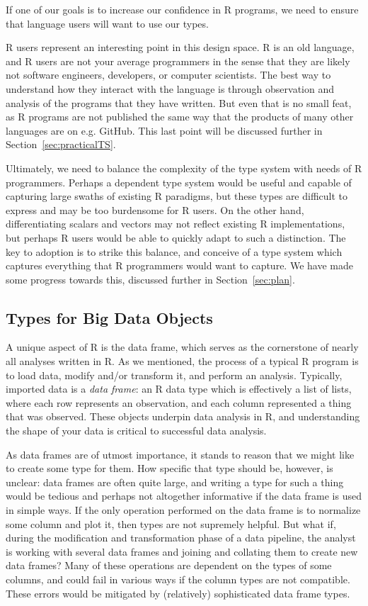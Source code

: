 \documentclass[sigplan,10pt,review,anonymous]{acmart}\settopmatter{printfolios=true,printccs=false,printacmref=false}
\begin{document}
If one of our goals is to increase our confidence in R programs, we need to ensure that language users will want to use our types.

R users represent an interesting point in this design space.
R is an old language, and R users are not your average programmers in the sense that they are likely not software engineers, developers, or computer scientists.
The best way to understand how they interact with the language is through observation and analysis of the programs that they have written.
But even that is no small feat, as R programs are not published the same way that the products of many other languages are on e.g. GitHub.
This last point will be discussed further in Section~\ref{sec:practicalTS}.

Ultimately, we need to balance the complexity of the type system with needs of R programmers.
Perhaps a dependent type system would be useful and capable of capturing large swaths of existing R paradigms, but these types are difficult to express and may be too burdensome for R users. 
On the other hand, differentiating scalars and vectors may not reflect existing R implementations, but perhaps R users would be able to quickly adapt to such a distinction.
The key to adoption is to strike this balance, and conceive of a type system which captures everything that R programmers would want to capture. 
We have made some progress towards this, discussed further in Section~\ref{sec:plan}.

%
%
\subsection{Types for Big Data Objects}

A unique aspect of R is the data frame, which serves as the cornerstone of nearly all analyses written in R.
As we mentioned, the process of a typical R program is to load data, modify and/or transform it, and perform an analysis.
Typically, imported data is a {\it data frame}: an R data type which is effectively a list of lists, where each row represents an observation, and each column represented a thing that was observed. 
These objects underpin data analysis in R, and understanding the shape of your data is critical to successful data analysis.

As data frames are of utmost importance, it stands to reason that we might like to create some type for them.
How specific that type should be, however, is unclear: data frames are often quite large, and writing a type for such a thing would be tedious and perhaps not altogether informative if the data frame is used in simple ways.
If the only operation performed on the data frame is to normalize some column and plot it, then types are not supremely helpful.
But what if, during the modification and transformation phase of a data pipeline, the analyst is working with several data frames and joining and collating them to create new data frames?
Many of these operations are dependent on the types of some columns, and could fail in various ways if the column types are not compatible.
These errors would be mitigated by (relatively) sophisticated data frame types.
\end{document}
